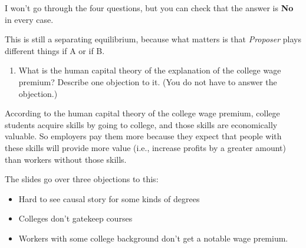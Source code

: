 \documentclass[
  12pt,
  letterpaper,
  DIV=11,
  numbers=noendperiod]{scrartcl}
\providecommand{\tightlist}{%
  \setlength{\itemsep}{0pt}\setlength{\parskip}{0pt}}\usepackage{longtable,booktabs,array}
\begin{document}
I won't go through the four questions, but you can check that the answer
is \textbf{No} in every case.

This is still a separating equilibrium, because what matters is that
\emph{Proposer} plays different things if A or if B.

\begin{enumerate}
\def\labelenumi{\arabic{enumi}.}
\setcounter{enumi}{11}
\tightlist
\item
  What is the human capital theory of the explanation of the college
  wage premium? Describe one objection to it. (You do not have to answer
  the objection.)
\end{enumerate}

According to the human capital theory of the college wage premium,
college students acquire skills by going to college, and those skills
are economically valuable. So employers pay them more because they
expect that people with these skills will provide more value (i.e.,
increase profits by a greater amount) than workers without those skills.

The slides go over three objections to this:

\begin{itemize}
\tightlist
\item
  Hard to see causal story for some kinds of degrees
\item
  Colleges don't gatekeep courses
\item
  Workers with some college background don't get a notable wage premium.
\end{itemize}
\end{document}
